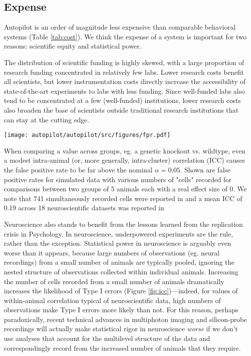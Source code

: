 \subsection{Expense}
\label{sec:expense}

Autopilot is an order of magnitude less expensive than comparable behavioral systems (Table \ref{tab:cost}). We think the expense of a system is important for two reasons: scientific equity and statistical power. 

The distribution of scientific funding is highly skewed, with a large proportion of research funding concentrated in relatively few labs\citep{katzBiomedicalEliteInequality2017}. Lower research costs benefit all scientists, but lower instrumentation costs directly increase the accessibility of state-of-the-art experiments to labs with less funding. Since well-funded labs also tend to be concentrated at a few (well-funded) institutions, lower research costs also broaden the base of scientists outside traditional research institutions that can stay at the cutting edge\citep{ashkenasEvenAffirmativeAction2017,clausetSystematicInequalityHierarchy2015,pearceExpandingEquitableAccess2019}.
%
\begin{marginfigure}[0.5cm]
\texttt{[image: autopilot/autopilot/src/figures/fpr.pdf]}
\caption{When comparing a value across groups, eg. a genetic knockout vs. wildtype, even a modest intra-animal (or, more generally, intra-cluster) correlation (ICC) causes the false positive rate to be far above the nominal $\alpha = 0.05$. Shown are false positive rates for simulated data with various numbers of "cells" recorded for comparisons between two groups of 5 animals each with a real effect size of 0. We note that 741 simultaneously recorded cells were reported in \citep{junFullyIntegratedSilicon2017} and a mean ICC of 0.19 across 18 neuroscientific datasets was reported in \citep{aartsSolutionDependencyUsing2014}}
\label{fig:icc}
\end{marginfigure}%
%
Neuroscience also stands to benefit from the lessons learned from the replication crisis in Psychology\citep{shroutPsychologyScienceKnowledge2018}. In neuroscience, underpowered experiments are the rule, rather than the exception\citep{buttonPowerFailureWhy2013}. Statistical power in neuroscience is arguably even worse than it appears, because large numbers of observations (eg. neural recordings) from a small number of animals are typically pooled, ignoring the nested structure of observations collected within individual animals. Increasing the number of cells recorded from a small number of animals dramatically increases the likelihood of Type I errors (Figure \ref{fig:icc})---indeed, for values of within-animal correlation typical of neuroscientific data, high numbers of observations make Type I errors more likely than not\citep{aartsSolutionDependencyUsing2014}. For this reason, perhaps paradoxically, recent technical advances in multiphoton imaging and silicon-probe recordings will actually make statistical rigor in neuroscience \textit{worse} if we don't use analyses that account for the multilevel structure of the data and correspondingly record from the increased number of animals that they require.




